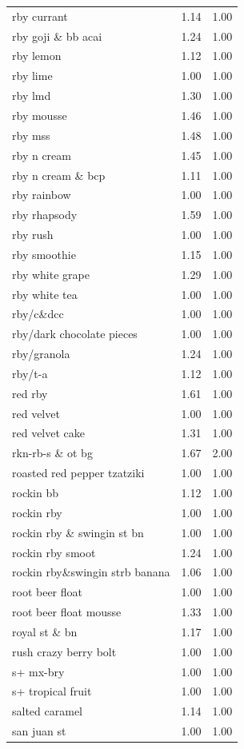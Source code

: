 \begin{table}
\begin{tabular}{lrr}
rby currant & 1.14 & 1.00 \\
rby goji \& bb acai & 1.24 & 1.00 \\
rby lemon & 1.12 & 1.00 \\
rby lime & 1.00 & 1.00 \\
rby lmd & 1.30 & 1.00 \\
rby mousse & 1.46 & 1.00 \\
rby mss & 1.48 & 1.00 \\
rby n cream & 1.45 & 1.00 \\
rby n cream \& bcp & 1.11 & 1.00 \\
rby rainbow & 1.00 & 1.00 \\
rby rhapsody & 1.59 & 1.00 \\
rby rush & 1.00 & 1.00 \\
rby smoothie & 1.15 & 1.00 \\
rby white grape & 1.29 & 1.00 \\
rby white tea & 1.00 & 1.00 \\
rby/c\&dcc & 1.00 & 1.00 \\
rby/dark chocolate pieces & 1.00 & 1.00 \\
rby/granola & 1.24 & 1.00 \\
rby/t-a & 1.12 & 1.00 \\
red rby & 1.61 & 1.00 \\
red velvet & 1.00 & 1.00 \\
red velvet cake & 1.31 & 1.00 \\
rkn-rb-s \& ot bg & 1.67 & 2.00 \\
roasted red pepper tzatziki & 1.00 & 1.00 \\
rockin bb & 1.12 & 1.00 \\
rockin rby & 1.00 & 1.00 \\
rockin rby \& swingin st bn & 1.00 & 1.00 \\
rockin rby smoot & 1.24 & 1.00 \\
rockin rby\&swingin strb banana & 1.06 & 1.00 \\
root beer float & 1.00 & 1.00 \\
root beer float mousse & 1.33 & 1.00 \\
royal st \& bn & 1.17 & 1.00 \\
rush crazy berry bolt & 1.00 & 1.00 \\
s+ mx-bry & 1.00 & 1.00 \\
s+ tropical fruit & 1.00 & 1.00 \\
salted caramel & 1.14 & 1.00 \\
san juan st & 1.00 & 1.00 \\

\end{tabular}
\end{table}

